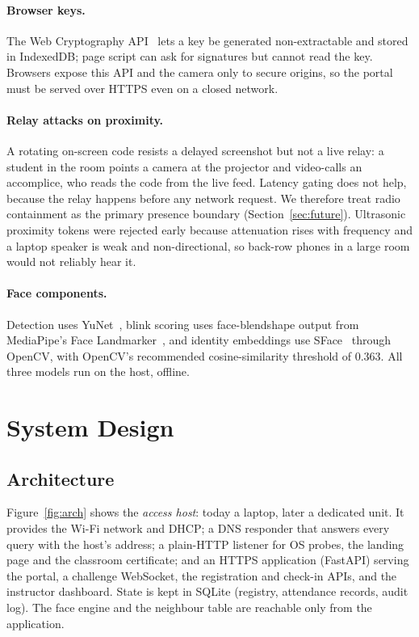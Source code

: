 \documentclass[11pt,a4paper]{article}
\begin{document}
\paragraph{Browser keys.} The Web Cryptography API~\cite{webcrypto} lets a key be generated non-extractable and stored in IndexedDB; page script can ask for signatures but cannot read the key. Browsers expose this API and the camera only to secure origins, so the portal must be served over HTTPS even on a closed network.

\paragraph{Relay attacks on proximity.} A rotating on-screen code resists a delayed screenshot but not a live relay: a student in the room points a camera at the projector and video-calls an accomplice, who reads the code from the live feed. Latency gating does not help, because the relay happens before any network request. We therefore treat radio containment as the primary presence boundary (Section~\ref{sec:future}). Ultrasonic proximity tokens were rejected early because attenuation rises with frequency and a laptop speaker is weak and non-directional, so back-row phones in a large room would not reliably hear it.

\paragraph{Face components.} Detection uses YuNet~\cite{yunet}, blink scoring uses face-blendshape output from MediaPipe's Face Landmarker~\cite{mediapipe}, and identity embeddings use SFace~\cite{sface} through OpenCV, with OpenCV's recommended cosine-similarity threshold of 0.363. All three models run on the host, offline.

\section{System Design}\label{sec:design}
\subsection{Architecture}
Figure~\ref{fig:arch} shows the \emph{access host}: today a laptop, later a dedicated unit. It provides the Wi-Fi network and DHCP; a DNS responder that answers every query with the host's address; a plain-HTTP listener for OS probes, the landing page and the classroom certificate; and an HTTPS application (FastAPI) serving the portal, a challenge WebSocket, the registration and check-in APIs, and the instructor dashboard. State is kept in SQLite (registry, attendance records, audit log). The face engine and the neighbour table are reachable only from the application.
\end{document}

